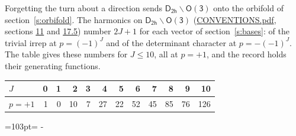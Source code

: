 \documentclass[10pt,a4paper]{article}
\newcommand{\needspace}[1]{\par\penalty-100\begingroup\dimen0=#1\relax\dimen2=\pagegoal
  \advance\dimen2-\pagetotal\ifdim\dimen0>\dimen2\relax\ifdim\dimen2>0pt\vfil\break\fi\fi
  \endgroup}
\numberwithin{equation}{section}
\newcommand{\grp}[1]{\mathsf{#1}}
\begin{document}
Forgetting the turn about a direction sends $\grp{D_{2h}}\backslash\grp{O(3)}$ onto the orbifold of section~\ref{s:orbifold}.
The harmonics on $\grp{D_{2h}}\backslash\grp{O(3)}$ (\href{../../CONVENTIONS.pdf}{CONVENTIONS.pdf}, sections \href{../../CONVENTIONS.pdf\#conv.11}{11} and \href{../../CONVENTIONS.pdf\#conv.17.5}{17.5}) number $2J + 1$ for each vector of section~\ref{s:bases}: of the trivial irrep at $p = (-1)^J$ and of the determinant character at $p = -(-1)^J$. The table gives these numbers for $J \le 10$, all at $p = +1$, and the record holds their generating functions.
{\small\setlength{\tabcolsep}{4pt}\begin{longtable}{@{}lrrrrrrrrrrr@{}}\toprule
$J$ & 0 & 1 & 2 & 3 & 4 & 5 & 6 & 7 & 8 & 9 & 10\\\midrule\endhead
\bottomrule\endfoot\endlastfoot
$p = +1$ & 1 & 0 & 10 & 7 & 27 & 22 & 52 & 45 & 85 & 76 & 126\\
\bottomrule\end{longtable}}
\needspace{103pt}
\end{document}

